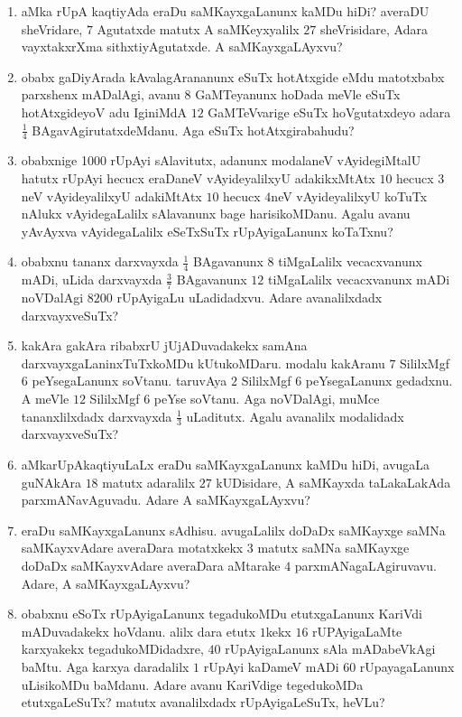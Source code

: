 \begin{enumerate}
\item aMka rUpA kaqtiyAda eraDu saMKayxgaLanunx kaMDu hiDi? averaDU
sheVridare, $7$ Agutatxde matutx A saMKeyxyalilx $27$ sheVrisidare,
Adara vayxtakxrXma sithxtiyAgutatxde. A saMKayxgaLAyxvu?

\item obabx gaDiyArada kAvalagArananunx eSuTx hotAtxgide eMdu
matotxbabx parxshenx mADalAgi, avanu $8$ GaMTeyanunx hoDada meVle
eSuTx hotAtxgideyoV adu IginiMdA $12$ GaMTeVvarige eSuTx hoVgutatxdeyo
adara $\frac{1}{4}$ BAgavAgirutatxdeMdanu. Aga eSuTx hotAtxgirabahudu? 

\item obabxnige 1000 rUpAyi sAlavitutx, adanunx modalaneV
vAyidegiMtalU hatutx rUpAyi hecucx era\-DaneV vAyideyalilxyU
adakikxMtAtx $10$ hecucx $3$neV vAyideyalilxyU adakiMtAtx $10$ hecucx
$4$neV vAyideyalilxyU koTuTx nAlukx vAyidegaLalilx sAlavanunx bage
harisikoMDanu. Agalu avanu yAvAyxva vAyidegaLalilx eSeTxSuTx
rUpAyigaLanunx koTaTxnu?

\item obabxnu tananx darxvayxda $\frac{1}{4}$ BAgavanunx $8$
tiMgaLalilx vecacxvanunx mADi, uLida darxvayxda $\frac{3}{7}$
BAgavanunx $12$ tiMgaLalilx vecacxvanunx mADi noVDalAgi $8200$
rUpAyigaLu uLadidadxvu. Adare avanalilxdadx darxvayxveSuTx?

\item kakAra gakAra ribabxrU jUjADuvadakekx samAna
darxvayxgaLaninxTuTxkoMDu kUtukoMDaru. modalu kakAranu $7$ SililxMgf
$6$ peYsegaLanunx soVtanu. taruvAya $2$ SililxMgf $6$ peYsegaLanunx
gedadxnu. A meVle $12$ SililxMgf $6$ peYse soVtanu. Aga noVDalAgi,
muMce tananxlilxdadx darxvayxda $\frac{1}{3}$ uLaditutx. Agalu
avanalilx modalidadx darxvayxveSuTx?

\item aMkarUpAkaqtiyuLaLx eraDu saMKayxgaLanunx kaMDu hiDi, avugaLa
guNAkAra $18$ matutx adaralilx $27$ kUDisidare, A saMKayxda
taLakaLakAda parxmANavAguvadu. Adare A saMKayxgaLAyxvu?

\item eraDu saMKayxgaLanunx sAdhisu. avugaLalilx doDaDx saMKayxge
saMNa saMKayxvAdare averaDara motatxkekx $3$ matutx saMNa saMKayxge
doDaDx saMKayxvAdare averaDara aMtarake $4$
parxmANagaLAgiruvavu. Adare, A saMKayxgaLAyxvu? 

\item obabxnu eSoTx  rUpAyigaLanunx tegadukoMDu etutxgaLanunx KariVdi
mADuvadakekx hoVdanu. alilx dara etutx $1$kekx $16$ rUPAyigaLaMte
karxyakekx tegadukoMDidadxre, $40$ rUpAyigaLanunx sAla mADabeVkAgi
baMtu. Aga karxya daradalilx $1$ rUpAyi kaDameV mADi $60$
rUpayagaLanunx uLisikoMDu baMdanu. Adare avanu KariVdige tegedukoMDa
etutxgaLeSuTx? matutx avanalilxdadx rUpAyigaLeSuTx, heVLu?


\end{enumerate}
